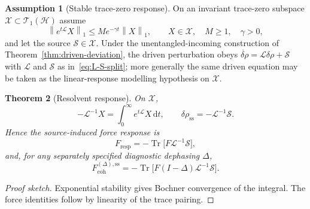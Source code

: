 \documentclass[11pt]{article}
\newtheorem{theorem}{Theorem}[section]
\theoremstyle{definition}
\newtheorem{assumption}[theorem]{Assumption}
\theoremstyle{remark}
\newcommand{\norm}[1]{\left\lVert #1\right\rVert}
\newcommand{\dd}{\mathrm{d}}
\newcommand{\Tr}{\operatorname{Tr}}
\begin{document}
\begin{assumption}[Stable trace-zero response]
\label{ass:stable-response-subspace}
On an invariant trace-zero subspace $\mathcal X\subset\mathcal T_1(\mathcal H)$ assume
\begin{equation}
  \norm{e^{t\mathcal L}X}_1\le M e^{-\gamma t}\norm{X}_1,
  \qquad X\in\mathcal X,\quad M\ge 1,\quad \gamma>0,
\end{equation}
and let the source $\mathcal S\in\mathcal X$.
Under the unentangled-incoming construction of Theorem~\ref{thm:driven-deviation}, the driven perturbation obeys $\dot{\delta\rho}=\mathcal L\delta\rho+\mathcal S$ with $\mathcal L$ and $\mathcal S$ as in~\eqref{eq:L-S-split}; more generally the same driven equation may be taken as the linear-response modelling hypothesis on $\mathcal X$.
\end{assumption}

\begin{theorem}[Resolvent response]\label{thm:resolvent-response}
On $\mathcal X$,
\begin{equation}
  -\mathcal L^{-1}X=\int_0^\infty e^{t\mathcal L}X\,\dd t,\qquad
  \delta\rho_{\mathrm{ss}}=-\mathcal L^{-1}\mathcal S.
\end{equation}
Hence the source-induced force response is
\begin{equation}
  F_{\mathrm{resp}}=-\Tr\bigl[F\mathcal L^{-1}\mathcal S\bigr],
\end{equation}
and, for any separately specified diagnostic dephasing $\Delta$,
\begin{equation}
  F^{(\Delta),\mathrm{ss}}_{\mathrm{coh}}=-\Tr\bigl[F(I-\Delta)\mathcal L^{-1}\mathcal S\bigr].
\end{equation}
\end{theorem}
\begin{proof}[Proof sketch]
Exponential stability gives Bochner convergence of the integral.
The force identities follow by linearity of the trace pairing.
\end{proof}
\end{document}
